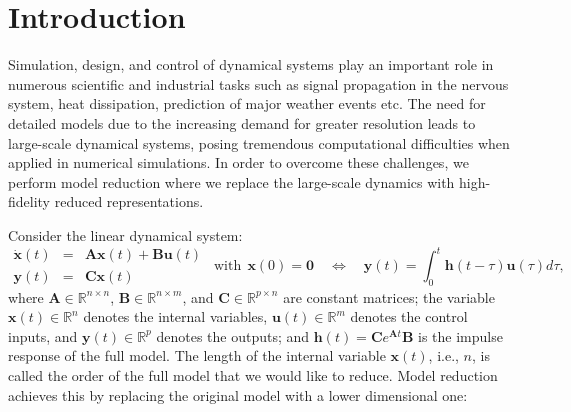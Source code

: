 \documentclass[preprint]{elsarticle}
\theoremstyle{definition}
\theoremstyle{definition}
\numberwithin{equation}{section}
\newcommand{\R}{\mathbb{R}}
\newcommand{\x}{\mathbf{x}}
\newcommand{\A}{\mathbf{A}}
\newcommand{\B}{\mathbf{B}}
\newcommand{\C}{\mathbf{C}}
\newcommand{\y}{\mathbf{y}}
\newcommand{\uu}{\mathbf{u}}
\newcommand{\h}{\mathbf{h}}
\begin{document}
\section{Introduction}
Simulation, design, and control of dynamical systems play an important role in numerous scientific and industrial tasks such as signal propagation in the nervous system, heat dissipation, prediction of major weather events etc. The need for  detailed  models due to the increasing demand for greater resolution leads to  
large-scale dynamical systems, posing tremendous computational difficulties when applied in numerical simulations. In order to overcome these challenges, we perform  model reduction where we replace the large-scale dynamics with high-fidelity reduced representations.

Consider the linear dynamical system:
\begin{equation}  \label{fom1}
\begin{array}{rcl}
\dot{\x}(t) & =& \A\x(t) +\B\uu(t)\\
\y(t)&=&\C\x(t) 
\end{array}
~~\mbox{with}~~ \x(0) = \mathbf{0}
\quad \Longleftrightarrow \quad
\y(t)=\int_{0}^{t}\h (t-\tau)\uu(\tau) d\tau,
\end{equation}
%
\noindent
where $\A \in \R^{n\times n}$, $\B\in \R^{n\times m}$, and $\C\in \R^{p\times n}$ are constant matrices; 
the variable $\x(t)\in \R^n$ denotes the internal variables, $\uu(t)\in \R^m$ denotes the control inputs, and $\y(t)\in \R^p$ denotes the outputs; and $\h(t)=\C e^{\A t}\B$ is the impulse response of the full model.   The length of the internal variable $\x(t)$, i.e., $n$, is called the order of the full model that we would like to reduce.  Model
reduction achieves this by replacing the original model with a lower dimensional one:
\end{document}
